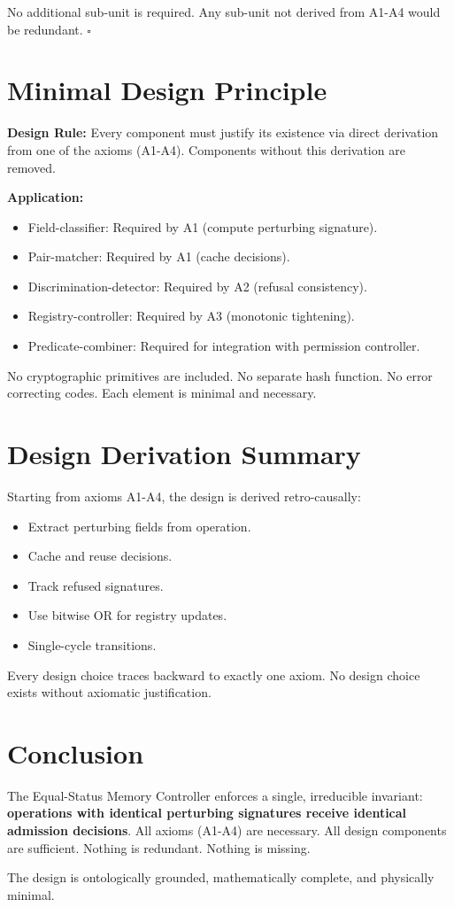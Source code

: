 \documentclass[11pt,oneside]{article}
\begin{document}
No additional sub-unit is required. Any sub-unit not derived from A1-A4 would be redundant. $\square$

\section{Minimal Design Principle}

\textbf{Design Rule:} Every component must justify its existence via direct derivation from one of the axioms (A1-A4). Components without this derivation are removed.

\textbf{Application:}
\begin{itemize}
\item Field-classifier: Required by A1 (compute perturbing signature).
\item Pair-matcher: Required by A1 (cache decisions).
\item Discrimination-detector: Required by A2 (refusal consistency).
\item Registry-controller: Required by A3 (monotonic tightening).
\item Predicate-combiner: Required for integration with permission controller.
\end{itemize}

No cryptographic primitives are included. No separate hash function. No error correcting codes. Each element is minimal and necessary.

\section{Design Derivation Summary}

Starting from axioms A1-A4, the design is derived retro-causally:

\begin{itemize}
\item[$\gets$ A1] Extract perturbing fields from operation.
\item[$\gets$ A1] Cache and reuse decisions.
\item[$\gets$ A2] Track refused signatures.
\item[$\gets$ A3] Use bitwise OR for registry updates.
\item[$\gets$ A4] Single-cycle transitions.
\end{itemize}

Every design choice traces backward to exactly one axiom. No design choice exists without axiomatic justification.

\section{Conclusion}

The Equal-Status Memory Controller enforces a single, irreducible invariant: \textbf{operations with identical perturbing signatures receive identical admission decisions}. All axioms (A1-A4) are necessary. All design components are sufficient. Nothing is redundant. Nothing is missing.

The design is ontologically grounded, mathematically complete, and physically minimal.
\end{document}
